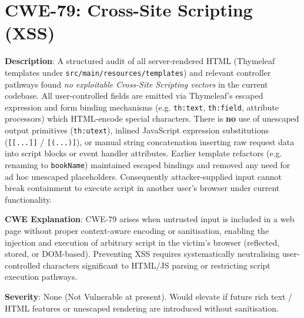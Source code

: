\documentclass[]{UCD_CS_FYP_Report}
\begin{document}
\section{CWE-79: Cross-Site Scripting (XSS)}

	\textbf{Description}: A structured audit of all server-rendered HTML (Thymeleaf templates under \texttt{src/main/resources/templates}) and relevant controller pathways found \textit{no exploitable Cross-Site Scripting vectors} in the current codebase. All user-controlled fields are emitted via Thymeleaf's escaped expression and form binding mechanisms (e.g. \texttt{th:text}, \texttt{th:field}, attribute processors) which HTML-encode special characters. There is \textbf{no} use of unescaped output primitives (\texttt{th:utext}), inlined JavaScript expression substitutions (\texttt{[[...]]} / \texttt{[(...)]}), or manual string concatenation inserting raw request data into script blocks or event handler attributes. Earlier template refactors (e.g. renaming to \texttt{bookName}) maintained escaped bindings and removed any need for ad hoc unescaped placeholders. Consequently attacker-supplied input cannot break containment to execute script in another user's browser under current functionality.

	\textbf{CWE Explanation}: CWE-79 arises when untrusted input is included in a web page without proper context-aware encoding or sanitisation, enabling the injection and execution of arbitrary script in the victim's browser (reflected, stored, or DOM-based). Preventing XSS requires systematically neutralising user-controlled characters significant to HTML/JS parsing or restricting script execution pathways.

	\textbf{Severity}: None (Not Vulnerable at present). Would elevate if future rich text / HTML features or unescaped rendering are introduced without sanitisation.
\end{document}
